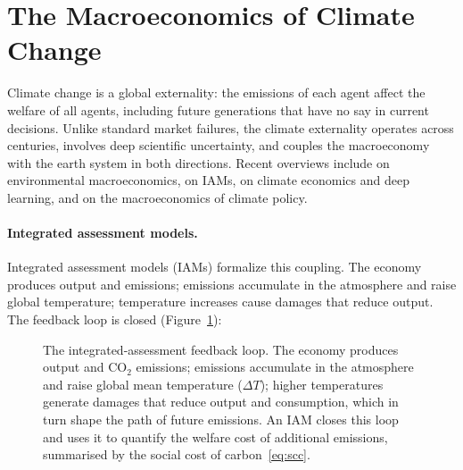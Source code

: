 \documentclass[11pt,a4paper]{report}
\begin{document}
\section{The Macroeconomics of Climate Change}
\label{sec:climate_motivation}

Climate change is a global externality: the emissions of each agent affect the welfare of all agents, including future generations that have no say in current decisions.  Unlike standard market failures, the climate externality operates across centuries, involves deep scientific uncertainty, and couples the macroeconomy with the earth system in both directions.  Recent overviews include \citet{hassler2016environmental} on environmental macroeconomics, \citet{DIETZ20241} on IAMs, \citet{fernandezvillaverde2025climate} on climate economics and deep learning, and \citet{vanderploegrezai2026climate} on the macroeconomics of climate policy.

\paragraph{Integrated assessment models.}
Integrated assessment models (IAMs) formalize this coupling.  The economy produces output and emissions; emissions accumulate in the atmosphere and raise global temperature; temperature increases cause damages that reduce output.  The feedback loop is closed (Figure~\ref{fig:iam_feedback_loop}):

\begin{figure}[ht]
\centering
{}
\caption{The integrated-assessment feedback loop. The economy produces output and CO$_2$ emissions; emissions accumulate in the atmosphere and raise global mean temperature ($\Delta T$); higher temperatures generate damages that reduce output and consumption, which in turn shape the path of future emissions. An IAM closes this loop and uses it to quantify the welfare cost of additional emissions, summarised by the social cost of carbon~\eqref{eq:scc}.}
\label{fig:iam_feedback_loop}
\end{figure}
\end{document}
